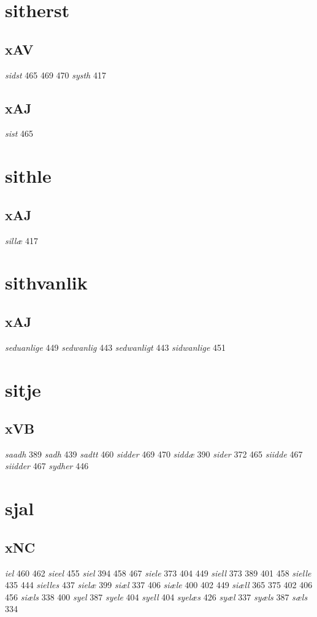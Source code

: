 \documentclass[a4paper,twocolumn]{article}
\begin{document}
\section{sitherst}
\label{sec:org2d20e11}
\subsection{xAV}
\label{sec:org815e401}
\emph{sidst} 465 469 470 \emph{systh} 417 
\subsection{xAJ}
\label{sec:org49b33c0}
\emph{sist} 465 
\section{sithle}
\label{sec:org2a421da}
\subsection{xAJ}
\label{sec:org1992eef}
\emph{sillæ} 417 
\section{sithvanlik}
\label{sec:orgf7be11d}
\subsection{xAJ}
\label{sec:orge3ecffb}
\emph{seduanlige} 449 \emph{sedwanlig} 443 \emph{sedwanligt} 443 \emph{sidwanlige} 451 
\section{sitje}
\label{sec:org74e04ca}
\subsection{xVB}
\label{sec:org7942fe1}
\emph{saadh} 389 \emph{sadh} 439 \emph{sadtt} 460 \emph{sidder} 469 470 \emph{siddæ} 390 \emph{sider} 372 465 \emph{siidde} 467 \emph{siidder} 467 \emph{sydher} 446 
\section{sjal}
\label{sec:org9022d10}
\subsection{xNC}
\label{sec:orgc900c1e}
\emph{iel} 460 462 \emph{sieel} 455 \emph{siel} 394 458 467 \emph{siele} 373 404 449 \emph{siell} 373 389 401 458 \emph{sielle} 435 444 \emph{sielles} 437 \emph{sielæ} 399 \emph{siæl} 337 406 \emph{siæle} 400 402 449 \emph{siæll} 365 375 402 406 456 \emph{siæls} 338 400 \emph{syel} 387 \emph{syele} 404 \emph{syell} 404 \emph{syelæs} 426 \emph{syæl} 337 \emph{syæls} 387 \emph{sæls} 334 
\end{document}
